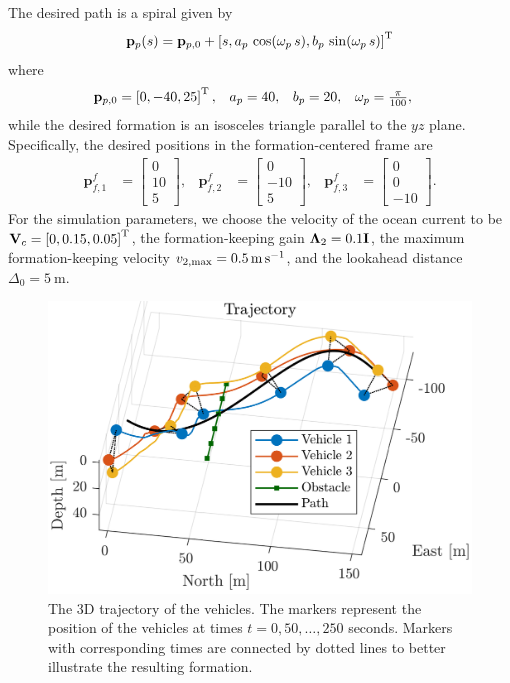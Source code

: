 The desired path is a spiral given by 
\begin{equation}
    \mathbf{p}_p(s) = \mathbf{p}_{p, 0} + \left[s, a_p\,\cos(\omega_p\,s), b_p\,\sin(\omega_p\,s)\right]^{\mathrm{T}}
\end{equation}
where 
\begin{align*}
    \mat{p}_{p, 0} &= \inlinevector{0, -40, 25}, &
    a_p &= 40, &
    b_p &= 20, &
    \omega_p &= \scale[1]{\frac{\pi}{100}},
\end{align*}
while the desired formation is an isosceles triangle parallel to the $yz$ plane.
Specifically, the desired positions in the formation-centered frame are 
\begin{align}
    \mathbf{p}_{f,1}^f &= \begin{bmatrix} 0 \\ 10 \\ 5\end{bmatrix}, &
    \mathbf{p}_{f,2}^f &= \begin{bmatrix} 0 \\ -10 \\ 5\end{bmatrix}, &
    \mathbf{p}_{f,3}^f &= \begin{bmatrix} 0 \\ 0 \\ -10\end{bmatrix}.
\end{align}
For the simulation parameters, we choose the velocity of the ocean current to be $\mathbf{V}_c = \left[0, 0.15, 0.05\right]^{\mathrm{T}}$, the formation-keeping gain $\bm{\Lambda}_2 = 0.1\mathbf{I}$, the maximum formation-keeping velocity $v_{2, \max} = \SI{0.5}{\meter\per\second}$, and the lookahead distance $\Delta_0 = \SI{5}{\meter}$.

\begin{figure}[t]
    \centering
    \includegraphics[width=.75\textwidth]{figures/nsb_R/trajectory.png}
    \vspace{-4mm}
    \caption{The 3D trajectory of the vehicles. The markers represent the position of the vehicles at times $t = 0, 50, \ldots, 250$ seconds. Markers with corresponding times are connected by dotted lines to better illustrate the resulting formation.}
    \label{fig:NSB_R_trajectory}
\end{figure}


